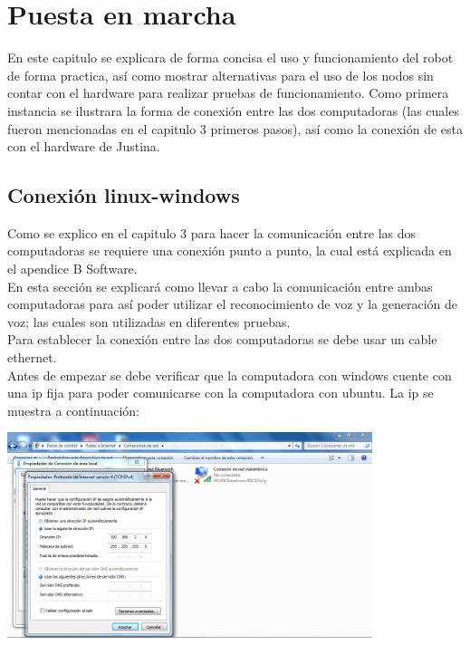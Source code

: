 \documentclass[user_manual.tex]{subfiles}
\begin{document}
\chapter{Puesta en marcha}
En este capitulo se explicara de forma concisa el uso y funcionamiento del robot de forma practica, así como mostrar alternativas para el uso de los nodos sin contar con el hardware para realizar pruebas de funcionamiento. Como primera instancia se ilustrara la forma de conexión entre las dos computadoras (las cuales fueron mencionadas en el capitulo 3 primeros pasos), así como la conexión de esta con el hardware de Justina.

\section{Conexión linux-windows}
Como se explico en el capitulo 3 para hacer la comunicación entre las dos computadoras se requiere una conexión punto a punto, la cual está explicada en el apendice B Software.\\

En esta sección se explicará como llevar a cabo la comunicación entre ambas computadoras para así poder utilizar el reconocimiento de voz y la generación de voz; las cuales son utilizadas en diferentes pruebas.\\

Para establecer la conexión entre las dos computadoras se debe usar un cable ethernet.\\

Antes de empezar se debe verificar que la computadora con windows cuente con una ip fija para poder comunicarse con la computadora con ubuntu. La ip se muestra a continuación:

\begin{center}
\includegraphics[width=0.8\textwidth]{Figures/Puesta_marcha/red.png}
\end{center}
\end{document}
